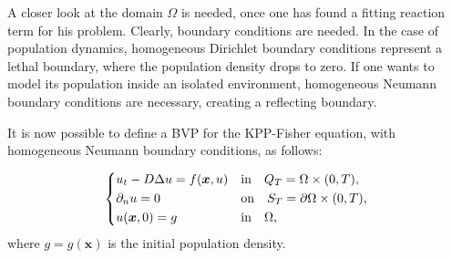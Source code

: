A closer look at the domain \(\Omega\) is needed, once one has found a fitting reaction term for his problem. Clearly, boundary conditions are needed. In the case of population dynamics, homogeneous Dirichlet boundary conditions represent a lethal boundary, where the population density drops to zero. If one wants to model its population inside an isolated environment, homogeneous Neumann boundary conditions are necessary, creating a reflecting boundary. 

It is now possible to define a BVP for the KPP-Fisher equation, with homogeneous Neumann boundary conditions, as follows:

\begin{equation}
    \begin{dcases}
        u_t - D \Delta u = f(\bm{x}, u) & \text{in} \quad Q_T = \Omega \times (0, T), \\
        \partial_{n}u = 0 & \text{on} \quad S_T = \partial \Omega \times (0, T), \\
        u(\bm{x}, 0) = g & \text{in} \quad \Omega,
    \end{dcases}
    \label{eq:fisher-kpp-bvp}
\end{equation}
where \(g = g(\bm{x})\) is the initial population density.

